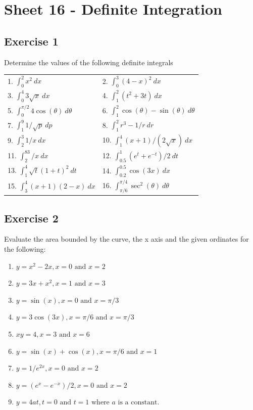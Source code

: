 \documentclass[
  11pt,
  oneside]{book}
\providecommand{\tightlist}{%
  \setlength{\itemsep}{0pt}\setlength{\parskip}{0pt}}
\newcommand{\slide}{}
\theoremstyle{definition}
\theoremstyle{definition}
\theoremstyle{definition}
\theoremstyle{definition}
\theoremstyle{remark}
\begin{document}
\slide

\section{Sheet 16 - Definite Integration}\label{sheet-16---definite-integration}

\subsection*{Exercise 1}\label{exercise-1-6}

Determine the values of the following definite integrals

\begin{tabular}{l|l}
\hline
 & \\
\hline
1. $\int_0^2 x^2\ dx$ & 2. $\int_0^3 (4-x)^2\ dx$\\
\hline
3. $\int_0^4 3\sqrt{x}\ dx$ & 4. $\int_1^2 (t^2+3t)\ dx$\\
\hline
5. $\int_0^{\pi/2}4\cos(\theta) \ d\theta$ & 6. $\int_1^2 \cos(\theta)-\sin(\theta)\ d\theta$\\
\hline
7. $\int_1^9 1/\sqrt{p}\ dp$ & 8. $\int_1^2 r^3-1/r\ dr$\\
\hline
9. $\int_2^3 1/x\ dx$ & 10. $\int_1^4 (x+1)/(2\sqrt{x})\ dx$\\
\hline
11. $\int_2^83/x \ dx$ & 12. $\int_{0.5}^1(e^t+e^{-t})/2 \ dt$\\
\hline
13. $\int_1^4 \sqrt{t}(1+t)^2 \ dt$ & 14. $\int_{0.2}^{0.5} \cos(3x)\ dx$\\
\hline
15. $\int_3^4 (x+1)(2-x)\ dx$ & 16. $\int_{\pi/6}^{\pi/4} \sec^2(\theta)\ d\theta$\\
\hline
\end{tabular}
\slide

\subsection*{Exercise 2}\label{exercise-2-6}

Evaluate the area bounded by the curve, the x axis and the given ordinates for the following:

\begin{enumerate}
\def\labelenumi{\arabic{enumi}.}
\tightlist
\item
  \(y=x^2-2x, x=0\text{ and }x=2\)
\item
  \(y=3x+x^2, x=1\text{ and }x=3\)
\item
  \(y=\sin(x), x=0\text{ and }x=\pi/3\)
\item
  \(y=3\cos(3x), x=\pi/6\text{ and }x=\pi/3\)
\item
  \(xy=4, x=3\text{ and }x=6\)
\item
  \(y=\sin(x)+\cos(x), x=\pi/6\text{ and }x=1\)
\item
  \(y=1/e^{2x}, x=0\text{ and }x=2\)
\item
  \(y=(e^x-e^{-x})/2, x=0\text{ and }x=2\)
\item
  \(y=4at, t=0\text{ and }t=1\text{ where }a\text{ is a constant}\).
\end{enumerate}
\end{document}
